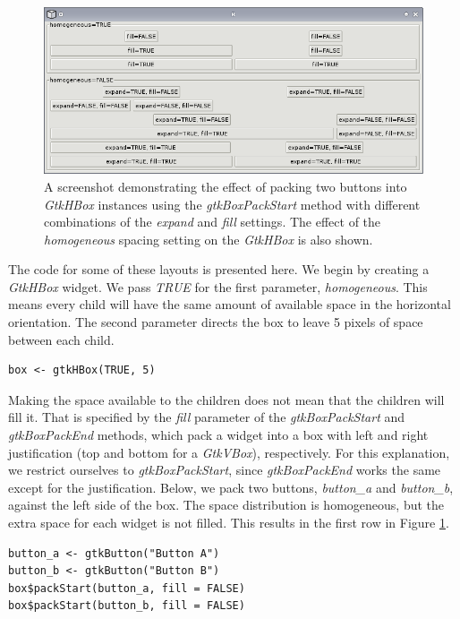 \documentclass[article]{jss}
\begin{document}
\begin{figure}
\begin{center}
\includegraphics{packing.png}
\caption{\label{fig:packing}A screenshot demonstrating the effect of packing two
buttons into \emph{GtkHBox} instances using the \emph{gtkBoxPackStart} method 
with different combinations of the \emph{expand} and \emph{fill} settings. 
The effect of the \emph{homogeneous} spacing setting on the \emph{GtkHBox} is 
also shown.}
\end{center}
\end{figure}

The code for some of these layouts is presented here.
We begin by creating a \emph{GtkHBox} widget. We pass \emph{TRUE} for the
first parameter, \emph{homogeneous}. This means every child will have the
same amount of available space in the horizontal orientation. The second 
parameter directs the box to leave 5 pixels of space between each child. 
\begin{verbatim}
box <- gtkHBox(TRUE, 5)
\end{verbatim}
Making the space available to the children does not mean that the
children will fill it. That is specified by the \emph{fill} parameter
of the \emph{gtkBoxPackStart} and \emph{gtkBoxPackEnd} methods, which
pack a widget into a box with left and right justification (top and
bottom for a \emph{GtkVBox}), respectively. For this explanation, we
restrict ourselves to \emph{gtkBoxPackStart}, since
\emph{gtkBoxPackEnd} works the same except for the
justification. Below, we pack two buttons, \emph{button\_a} and
\emph{button\_b}, against the left side of the box. The space
distribution is homogeneous, but the extra space for each widget is
not filled. This results in the first row in Figure \ref{fig:packing}.
\begin{verbatim}
button_a <- gtkButton("Button A")
button_b <- gtkButton("Button B")
box$packStart(button_a, fill = FALSE)
box$packStart(button_b, fill = FALSE)
\end{verbatim}
\end{document}
